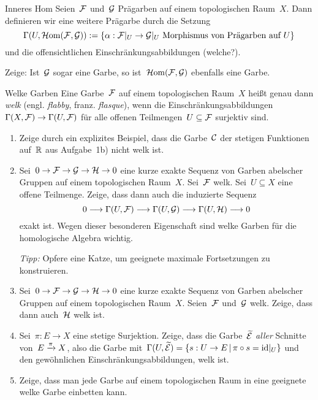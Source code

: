 \documentclass{uebblatt}
\begin{document}
\begin{aufgabe}{Inneres Hom}
Seien~$\mathcal{F}$ und~$\mathcal{G}$ Prägarben auf einem topologischen Raum~$X$. Dann
definieren wir eine weitere Prägarbe durch die Setzung
\[ \Gamma(U, \mathcal{H}\mathrm{om}(\mathcal{F},\mathcal{G})) := \{ \alpha : \mathcal{F}|_U \to \mathcal{G}|_U \text{ Morphismus von Prägarben auf~$U$} \} \]
und die offensichtlichen Einschränkungsabbildungen (welche?).

Zeige: Ist~$\mathcal{G}$ sogar eine Garbe, so ist~$\mathcal{H}\mathrm{om}(\mathcal{F},\mathcal{G})$ ebenfalls eine Garbe.
\end{aufgabe}

\begin{aufgabe}{Welke Garben}
Eine Garbe~$\mathcal{F}$ auf einem topologischen Raum~$X$ heißt genau dann \emph{welk}
(engl. \emph{flabby}, franz. \emph{flasque}),
wenn die Einschränkungsabbildungen~$\Gamma(X,\mathcal{F}) \to \Gamma(U,\mathcal{F})$ für alle
offenen Teilmengen~$U \subseteq \mathcal{F}$ surjektiv sind.

\begin{enumerate}
\item Zeige durch ein explizites Beispiel, dass die Garbe~$\mathcal{C}$ der stetigen
Funktionen auf~$\mathbb{R}$ aus Aufgabe~1b) nicht welk ist.
\item Sei~$0 \to \mathcal{F} \to \mathcal{G} \to \mathcal{H} \to 0$ eine kurze exakte Sequenz von Garben
abelscher Gruppen auf einem topologischen Raum~$X$. Sei~$\mathcal{F}$ welk. Sei~$U
\subseteq X$ eine offene Teilmenge. Zeige, dass
dann auch die induzierte Sequenz
\[ 0 \longrightarrow \Gamma(U,\mathcal{F}) \longrightarrow \Gamma(U,\mathcal{G}) \longrightarrow \Gamma(U,\mathcal{H}) \longrightarrow 0 \]
exakt ist. Wegen dieser besonderen Eigenschaft sind welke Garben für die
homologische Algebra wichtig.

\emph{Tipp:} Opfere eine Katze, um geeignete maximale Fortsetzungen
zu konstruieren.
\item Sei~$0 \to \mathcal{F} \to \mathcal{G} \to \mathcal{H} \to 0$ eine kurze exakte Sequenz von Garben
abelscher Gruppen auf einem topologischen Raum~$X$. Seien~$\mathcal{F}$ und~$\mathcal{G}$ welk.
Zeige, dass dann auch~$\mathcal{H}$ welk ist.
\item Sei~$\pi : E \to X$ eine stetige Surjektion. Zeige, dass die
Garbe~$\widetilde{\mathcal{E}}$ \emph{aller} Schnitte von~$E \xrightarrow{\pi} X$, also die Garbe
mit~$\Gamma(U,\widetilde{\mathcal{E}}) = \{ s : U \to E \,|\, \pi
\circ s = \mathrm{id}|_U \}$ und den gewöhnlichen Einschränkungsabbildungen, welk ist.
\item Zeige, dass man jede Garbe auf einem topologischen Raum in eine geeignete
welke Garbe einbetten kann.
\end{enumerate}
\end{aufgabe}
\end{document}
